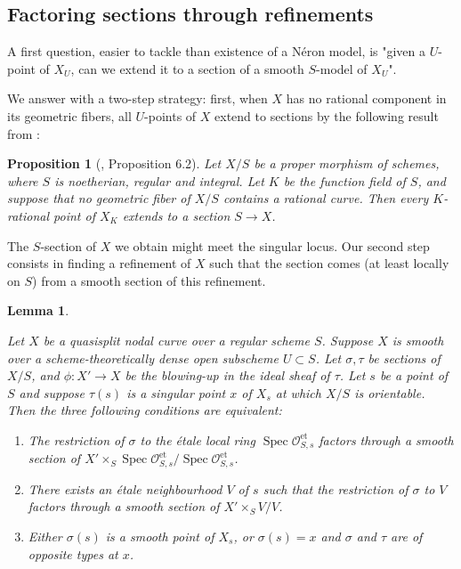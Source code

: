 \documentclass[a4paper,10pt,twoside]{article}
\newcommand{\ra}{\rightarrow}
\newcommand{\on}[1]{\operatorname{#1}}
\renewcommand{\O}{\mathcal{O}}
\DeclareMathOperator{\spec}{Spec}
\newtheorem{lem}[thm]{Lemma}
\newtheorem{prop}[thm]{Proposition}
\theoremstyle{definition}
\theoremstyle{remark}
\renewcommand{\on}[1]{\operatorname{#1}}
\begin{document}
\subsection{Factoring sections through refinements}\label{Factoring sections through refinements}
A first question, easier to tackle than existence of a N\'eron model, is "given a $U$-point of $X_U$, can we extend it to a section of a smooth $S$-model of $X_U$".

We answer with a two-step strategy: first, when $X$ has no rational component in its geometric fibers, all $U$-points of $X$ extend to sections by the following result from \cite{HypersurfacesMovingLemma}:
\begin{prop}[\cite{HypersurfacesMovingLemma}, Proposition 6.2]\label{pas de courbe rationnelle ==> les points rationnels s'étendent en sections}
	Let $X/S$ be a proper morphism of schemes, where $S$ is noetherian, regular and integral. Let $K$ be the function field of $S$, and suppose that no geometric fiber of $X/S$ contains a rational curve. Then every $K$-rational point of $X_K$ extends to a section $S\ra X$.
\end{prop}

The $S$-section of $X$ we obtain might meet the singular locus. Our second step consists in finding a refinement of $X$ such that the section comes (at least locally on $S$) from a smooth section of this refinement.


\begin{lem}\label{lemme condition pour factoriser une section par un raffinement asymetrique}
	
	Let $X$ be a quasisplit nodal curve over a regular scheme $S$. Suppose $X$ is smooth over a scheme-theoretically dense open subscheme $U\subset S$. Let $\sigma,\tau$ be sections of $X/S$, and $\phi\colon X'\to X$ be the blowing-up in the ideal sheaf of $\tau$. Let $s$ be a point of $S$ and suppose $\tau(s)$ is a singular point $x$ of $X_s$ at which $X/S$ is orientable. Then the three following conditions are equivalent:
	\begin{enumerate}
	\item The restriction of $\sigma$ to the \'etale local ring $\spec\O_{S,s}^{\on{et}}$ factors through a smooth section of $X'\times_S \spec\O_{S,s}^{\on{et}}/\spec\O_{S,s}^{\on{et}}$.
	\item There exists an \'etale neighbourhood $V$ of $s$ such that the restriction of $\sigma$ to $V$ factors through a smooth section of $X'\times_S V/V$.
	\item Either $\sigma(s)$ is a smooth point of $X_s$, or $\sigma(s)=x$ and $\sigma$ and $\tau$ are of opposite types at $x$.
	\end{enumerate}
\end{lem}
\end{document}
